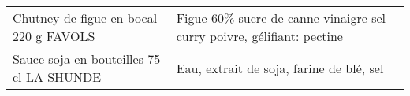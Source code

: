 \begin{longtable}{p{5cm}p{10cm}}
                                                                   Chutney de figue en bocal 220 g FAVOLS &                                                                                                                                                                                                                                                                                                                                                                                                                                                                                                                                                                                                                                                                                                                                                                                                                                                                                                                                                                   Figue 60\% sucre de canne vinaigre sel curry poivre, gélifiant: pectine \\
                                                                 Sauce soja en bouteilles 75 cl LA SHUNDE &                                                                                                                                                                                                                                                                                                                                                                                                                                                                                                                                                                                                                                                                                                                                                                                                                                                                                                                                                                                                 Eau, extrait de soja, farine de blé, sel \\

\end{longtable}

